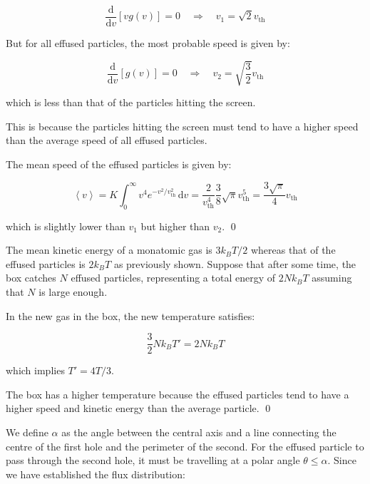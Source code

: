 \documentclass[12pt]{article}
\begin{document}
\begin{equation}
    \frac{\mathrm{d}}{\mathrm{d}v} \left[ v g(v) \right] = 0 \quad \Rightarrow \quad v_{1} = \sqrt{2} v_{\text{th}}
\end{equation}

But for all effused particles, the most probable speed is given by:

\begin{equation}
    \frac{\mathrm{d}}{\mathrm{d}v} \left[ g(v) \right] = 0 \quad \Rightarrow \quad v_{2} = \sqrt{\frac{3}{2}} v_{\text{th}}
\end{equation}

which is less than that of the particles hitting the screen.

This is because the particles hitting the screen must tend to have a higher speed than the average speed of all effused particles.

The mean speed of the effused particles is given by:

\begin{equation}
    \left\langle v \right\rangle = K \int_{0}^{\infty} v^{4} e^{-v^{2}/v_{\text{th}}^{2}} \, \mathrm{d}v = \frac{2}{v_{\text{th}}^{4}} \frac{3}{8} \sqrt{\pi} v_{\text{th}}^{5} = \frac{3\sqrt{\pi}}{4} v_{\text{th}}
\end{equation}

which is slightly lower than $v_{1}$ but higher than $v_{2}$.
\qed


The mean kinetic energy of a monatomic gas is $3k_{B}T/2$ whereas that of the effused particles is $2k_{B}T$ as previously shown. Suppose that after some time, the box catches $N$ effused particles, representing a total energy of $2Nk_{B}T$ assuming that $N$ is large enough.

In the new gas in the box, the new temperature satisfies:

\begin{equation}
    \frac{3}{2} Nk_{B}T' = 2Nk_{B}T
\end{equation}

which implies $T' = 4T/3$.

The box has a higher temperature because the effused particles tend to have a higher speed and kinetic energy than the average particle.
\qed



We define $\alpha$ as the angle between the central axis and a line connecting the centre of the first hole and the perimeter of the second. For the effused particle to pass through the second hole, it must be travelling at a polar angle $\theta \le \alpha$. Since we have established the flux distribution:
\end{document}
